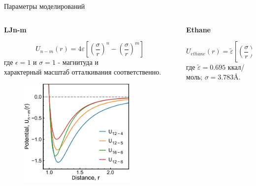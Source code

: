 \documentclass{beamer} %
\newcommand{\jj}{\righthyphenmin=20 \justifying} %
\begin{document}
\begin{frame}{Параметры моделирований}
  \footnotesize{

    \begin{columns}
      \begin{column}{0.5\linewidth}

        \centering \textbf{LJn-m}

        \begin{equation}
          U_{n-m}(r)=4 \varepsilon\left[\left(\frac{\sigma}{r}\right)^{n}-\left(\frac{\sigma}{r}\right)^{m}\right]
          \label{eqGenLJ}
        \end{equation}
        \jj где $\epsilon = 1$ и $\sigma = 1$ - магнитуда и \\ характерный масштаб отталкивания соответственно.

        \vspace{0.0cm}

        \begin{figure}
          \centering
          \includegraphics[width=0.8\textwidth]{LJ_no_norm.pdf}
        \end{figure}

      \end{column}

      \begin{column}{0.5\linewidth}

        \vspace{0.4cm}
        \centering \textbf{Ethane}

        \begin{equation}
          U_{ethane}(r) = \tilde \varepsilon\left[\left(\frac{\sigma}{r}\right)^{16}-\left(\frac{\sigma}{r}\right)^{6}\right],
          \label{eqEthan}
        \end{equation}
        \jj где $\tilde \varepsilon = 0.695$ ккал/моль; $\sigma = 3.783$\AA.


\end{column}
\end{columns}}
\end{frame}
\end{document}
